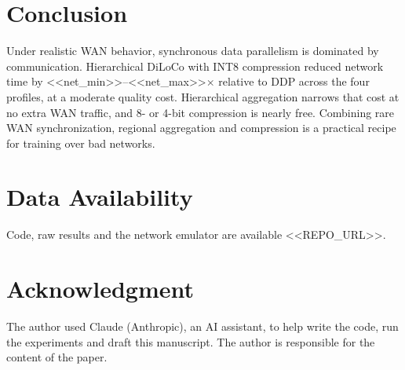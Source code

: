 \documentclass[conference]{IEEEtran}
\begin{document}
\section{Conclusion}
Under realistic WAN behavior, synchronous data parallelism is dominated by communication. Hierarchical DiLoCo with INT8 compression reduced network time by <<net_min>>--<<net_max>>$\times$ relative to DDP across the four profiles, at a moderate quality cost. Hierarchical aggregation narrows that cost at no extra WAN traffic, and 8- or 4-bit compression is nearly free. Combining rare WAN synchronization, regional aggregation and compression is a practical recipe for training over bad networks.

\section*{Data Availability}
Code, raw results and the network emulator are available <<REPO_URL>>.

\section*{Acknowledgment}
The author used Claude (Anthropic), an AI assistant, to help write the code, run the experiments and draft this manuscript. The author is responsible for the content of the paper.



\end{document}
